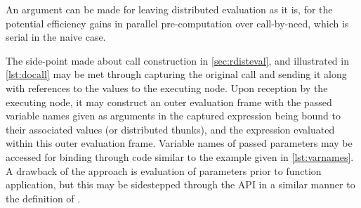 An argument can be made for leaving distributed evaluation as it is, for the potential efficiency gains in parallel pre-computation over call-by-need, which is serial in the naive case.

The side-point made about call construction in \cref{sec:rdisteval}, and illustrated in \cref{lst:docall} may be met through capturing the original call and sending it along with references to the values to the executing node.
Upon reception by the executing node, it may construct an outer evaluation frame with the passed variable names given as arguments in the captured expression being bound to their associated values (or distributed thunks)\cite{ingerman1961thunks}, and the expression evaluated within this outer evaluation frame.
Variable names of passed parameters may be accessed for binding through code similar to the example given in \cref{lst:varnames}.
A drawback of the approach is evaluation of parameters prior to function application, but this may be sidestepped through the  API in a similar manner to the definition of \cite{abelson1996sicp:order}.

